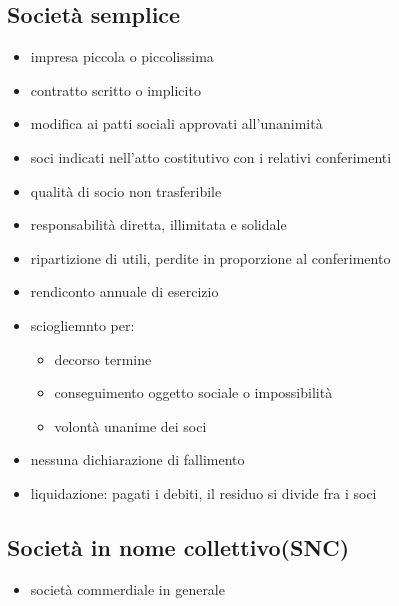 \subsection{Società semplice}
\begin{itemize}
    \item impresa piccola o piccolissima
    \item contratto scritto o implicito
    \item modifica ai patti sociali approvati all'unanimità
    \item soci indicati nell'atto costitutivo con i relativi conferimenti
    \item qualità di socio non trasferibile
    \item responsabilità diretta, illimitata e solidale
    \item ripartizione di utili, perdite in proporzione al conferimento
    \item rendiconto annuale di esercizio
    \item sciogliemnto per:
    \begin{itemize}
        \item decorso termine
        \item conseguimento oggetto sociale o impossibilità
        \item volontà unanime dei soci
    \end{itemize}
    \item nessuna dichiarazione di fallimento
    \item liquidazione: pagati i debiti, il residuo si divide fra i soci
\end{itemize}

\subsection{Società in nome collettivo(SNC)}
\begin{itemize}
	\item società commerdiale in generale
\end{itemize}

